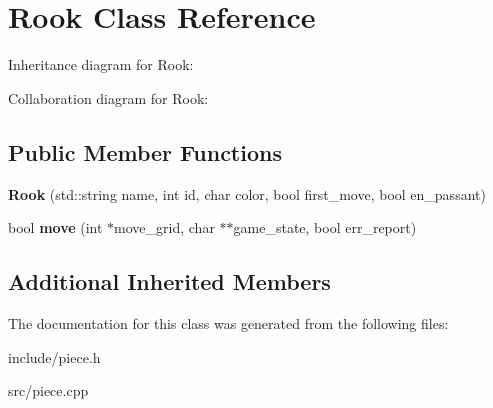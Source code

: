 \hypertarget{classRook}{}\section{Rook Class Reference}
\label{classRook}


Inheritance diagram for Rook\+:


Collaboration diagram for Rook\+:
\subsection*{Public Member Functions}
\begin{DoxyCompactItemize}
\item 
\mbox{\label{classRook_a48e720226de2591213d93345dd349bc9}} 
{\bfseries Rook} (std\+::string name, int id, char color, bool first\+\_\+move, bool en\+\_\+passant)
\item 
\mbox{\label{classRook_a2b9f92d99edbd415e75ebc4e15121a89}} 
bool {\bfseries move} (int $\ast$move\+\_\+grid, char $\ast$$\ast$game\+\_\+state, bool err\+\_\+report)
\end{DoxyCompactItemize}
\subsection*{Additional Inherited Members}


The documentation for this class was generated from the following files\+:\begin{DoxyCompactItemize}
\item 
include/piece.\+h\item 
src/piece.\+cpp\end{DoxyCompactItemize}
